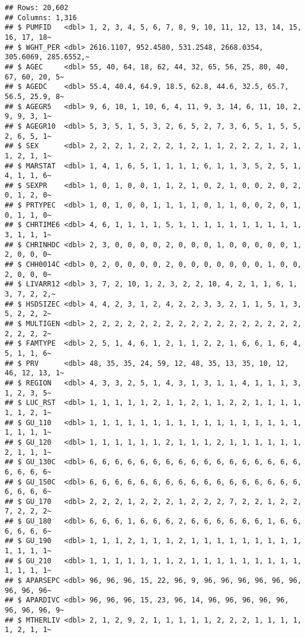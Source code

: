 \documentclass[
]{article}
\begin{document}
\begin{verbatim}
## Rows: 20,602
## Columns: 1,316
## $ PUMFID   <dbl> 1, 2, 3, 4, 5, 6, 7, 8, 9, 10, 11, 12, 13, 14, 15, 16, 17, 18~
## $ WGHT_PER <dbl> 2616.1107, 952.4580, 531.2548, 2668.0354, 305.6069, 285.6552,~
## $ AGEC     <dbl> 55, 40, 64, 18, 62, 44, 32, 65, 56, 25, 80, 40, 67, 60, 20, 5~
## $ AGEDC    <dbl> 55.4, 40.4, 64.9, 18.5, 62.8, 44.6, 32.5, 65.7, 56.5, 25.9, 8~
## $ AGEGR5   <dbl> 9, 6, 10, 1, 10, 6, 4, 11, 9, 3, 14, 6, 11, 10, 2, 9, 9, 3, 1~
## $ AGEGR10  <dbl> 5, 3, 5, 1, 5, 3, 2, 6, 5, 2, 7, 3, 6, 5, 1, 5, 5, 2, 6, 5, 1~
## $ SEX      <dbl> 2, 2, 2, 1, 2, 2, 2, 1, 2, 1, 1, 2, 2, 2, 1, 2, 1, 1, 2, 1, 1~
## $ MARSTAT  <dbl> 1, 4, 1, 6, 5, 1, 1, 1, 1, 6, 1, 1, 3, 5, 2, 5, 1, 4, 1, 1, 6~
## $ SEXPR    <dbl> 1, 0, 1, 0, 0, 1, 1, 2, 1, 0, 2, 1, 0, 0, 2, 0, 2, 0, 1, 2, 0~
## $ PRTYPEC  <dbl> 1, 0, 1, 0, 0, 1, 1, 1, 1, 0, 1, 1, 0, 0, 2, 0, 1, 0, 1, 1, 0~
## $ CHRTIME6 <dbl> 4, 6, 1, 1, 1, 1, 5, 1, 1, 1, 1, 1, 1, 1, 1, 1, 1, 3, 1, 1, 1~
## $ CHRINHDC <dbl> 2, 3, 0, 0, 0, 0, 2, 0, 0, 0, 1, 0, 0, 0, 0, 0, 1, 2, 0, 0, 0~
## $ CHH0014C <dbl> 0, 2, 0, 0, 0, 0, 2, 0, 0, 0, 0, 0, 0, 0, 1, 0, 0, 2, 0, 0, 0~
## $ LIVARR12 <dbl> 3, 7, 2, 10, 1, 2, 3, 2, 2, 10, 4, 2, 1, 1, 6, 1, 3, 7, 2, 2,~
## $ HSDSIZEC <dbl> 4, 4, 2, 3, 1, 2, 4, 2, 2, 3, 3, 2, 1, 1, 5, 1, 3, 5, 2, 2, 2~
## $ MULTIGEN <dbl> 2, 2, 2, 2, 2, 2, 2, 2, 2, 2, 2, 2, 2, 2, 2, 2, 2, 2, 2, 2, 2~
## $ FAMTYPE  <dbl> 2, 5, 1, 4, 6, 1, 2, 1, 1, 2, 2, 1, 6, 6, 1, 6, 4, 5, 1, 1, 6~
## $ PRV      <dbl> 48, 35, 35, 24, 59, 12, 48, 35, 13, 35, 10, 12, 46, 12, 13, 1~
## $ REGION   <dbl> 4, 3, 3, 2, 5, 1, 4, 3, 1, 3, 1, 1, 4, 1, 1, 1, 3, 1, 2, 3, 5~
## $ LUC_RST  <dbl> 1, 1, 1, 1, 1, 2, 1, 1, 2, 1, 1, 2, 2, 1, 1, 1, 1, 1, 1, 2, 1~
## $ GU_110   <dbl> 1, 1, 1, 1, 1, 1, 1, 1, 1, 1, 1, 1, 1, 1, 1, 1, 1, 1, 1, 1, 1~
## $ GU_120   <dbl> 1, 1, 1, 1, 1, 1, 2, 1, 1, 1, 2, 1, 1, 1, 1, 1, 1, 2, 1, 1, 1~
## $ GU_130C  <dbl> 6, 6, 6, 6, 6, 6, 6, 6, 6, 6, 6, 6, 6, 6, 6, 6, 6, 6, 6, 6, 6~
## $ GU_150C  <dbl> 6, 6, 6, 6, 6, 6, 6, 6, 6, 6, 6, 6, 6, 6, 6, 6, 6, 6, 6, 6, 6~
## $ GU_170   <dbl> 2, 2, 2, 1, 2, 2, 2, 1, 2, 2, 2, 7, 2, 2, 1, 2, 2, 7, 2, 2, 2~
## $ GU_180   <dbl> 6, 6, 6, 1, 6, 6, 6, 2, 6, 6, 6, 6, 6, 6, 1, 6, 6, 6, 6, 6, 6~
## $ GU_190   <dbl> 1, 1, 1, 2, 1, 1, 1, 2, 1, 1, 1, 1, 1, 1, 1, 1, 1, 1, 1, 1, 1~
## $ GU_210   <dbl> 1, 1, 1, 1, 1, 1, 1, 2, 1, 1, 1, 1, 1, 1, 1, 1, 1, 1, 1, 1, 1~
## $ APARSEPC <dbl> 96, 96, 96, 15, 22, 96, 9, 96, 96, 96, 96, 96, 96, 96, 96, 96~
## $ APARDIVC <dbl> 96, 96, 96, 15, 23, 96, 14, 96, 96, 96, 96, 96, 96, 96, 96, 9~
## $ MTHERLIV <dbl> 2, 1, 2, 9, 2, 1, 1, 1, 1, 1, 2, 2, 2, 1, 1, 1, 1, 1, 2, 1, 1~

\end{verbatim}
\end{document}
